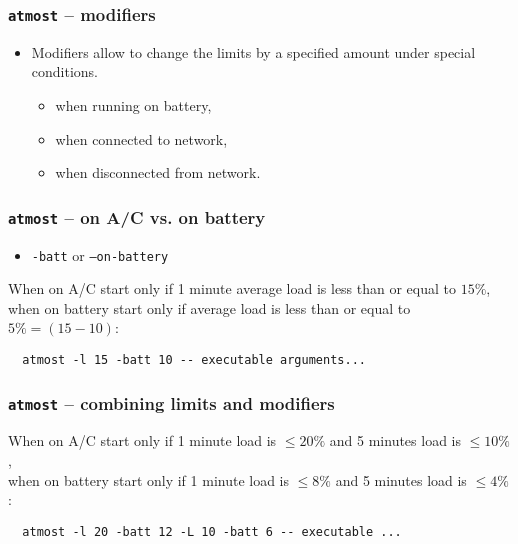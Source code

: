 \documentclass[compress,table,xcolor=table]{beamer}
\newcommand{\shelltext}[1]{\texttt{\colorbox{light-gray}{#1}}}
\begin{document}
\begin{frame}[fragile]
  \frametitle{\shelltext{atmost} -- modifiers}
  \begin{itemize}
    \Large
    \item Modifiers allow to change the limits by a specified amount under
      special conditions.
    \begin{itemize}
      \large
      \item when running on battery,
      \item when connected to  network,
      \item when disconnected from network.
    \end{itemize}
  \end{itemize}
\end{frame}
\begin{frame}[fragile]
  \frametitle{\shelltext{atmost} -- on A/C vs. on battery}
  \begin{itemize}
    \item \shelltext{-batt} or \shelltext{--on-battery}
  \end{itemize}

  \large
  When on A/C start only if 1 minute average load is less than or equal to $15\%$,\\
  when on battery start only if average load is less than or equal to $5\% = (15-10)$:
  \normalsize
  \begin{verbatim}
  atmost -l 15 -batt 10 -- executable arguments...
  \end{verbatim}

\end{frame}
\begin{frame}[fragile]
  \frametitle{\shelltext{atmost} -- combining limits and modifiers}

  \large
  When on A/C start only if 1 minute load is $\leq 20\%$ and
  5 minutes load is $\leq 10\%$,\\
  when on battery start only if 1 minute load is $\leq 8\%$ and
  5 minutes load is $\leq 4\%$:
  \normalsize
  \begin{verbatim}
  atmost -l 20 -batt 12 -L 10 -batt 6 -- executable ...
  \end{verbatim}

\end{frame}
\end{document}
